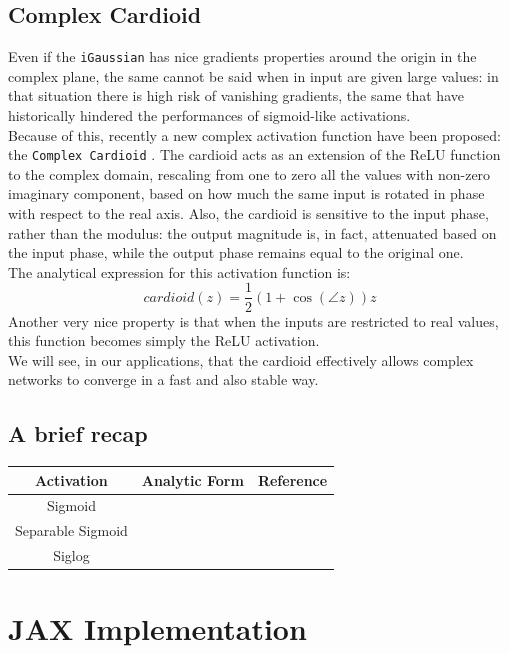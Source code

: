 \documentclass[../main.tex]{subfiles}
\begin{document}
\subsection*{Complex Cardioid}
Even if the \texttt{iGaussian} has nice gradients properties around the origin in the complex plane, the same cannot be said when in input are given large values: in that situation there is high risk of vanishing gradients, the same that have historically hindered the performances of sigmoid-like activations.\\
Because of this, recently a new complex activation function have been proposed: the \texttt{Complex Cardioid} \cite{Virtue:EECS-2019-126}. The cardioid acts as an extension of the ReLU function to the complex domain, rescaling from one to zero all the values with non-zero imaginary component, based on how much the same input is rotated in phase with respect to the real axis. Also, the cardioid is sensitive to the input phase, rather than the modulus: the output magnitude is, in fact, attenuated based on the input phase, while the output phase remains equal to the original one.\\
The analytical expression for this activation function is:
\[ cardioid(z) = \frac{1}{2}\left(1 + \cos(\angle z)\right)z \]
Another very nice property is that when the inputs are restricted to real values, this function becomes simply the ReLU activation.\\
We will see, in our applications, that the cardioid effectively allows complex networks to converge in a fast and also stable way.

\subsection*{A brief recap}

\begin{table}[!ht]
\centering
\begin{tabular}{c c c}
\toprule
\textbf{Activation} & \textbf{Analytic Form} & \textbf{Reference}\\
\midrule
Sigmoid \\
Separable Sigmoid\\
Siglog\\

\bottomrule
\end{tabular}
\end{table}

\section{JAX Implementation}

\end{document}
